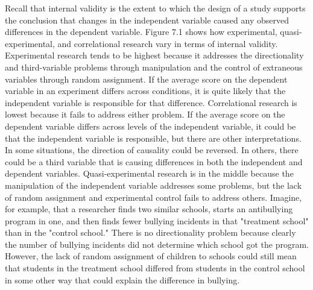 Recall that internal validity is the extent to which the design of a study supports the conclusion that changes in the independent variable caused any observed differences in the dependent variable. Figure 7.1 shows how experimental, quasi-experimental, and correlational research vary in terms of internal validity. Experimental research tends to be highest because it addresses the directionality and third-variable problems through manipulation and the control of extraneous variables through random assignment. If the average score on the dependent variable in an experiment differs across conditions, it is quite likely that the independent variable is responsible for that difference. Correlational research is lowest because it fails to address either problem. If the average score on the dependent variable differs across levels of the independent variable, it could be that the independent variable is responsible, but there are other interpretations. In some situations, the direction of causality could be reversed. In others, there could be a third variable that is causing differences in both the independent and dependent variables. Quasi-experimental research is in the middle because the manipulation of the independent variable addresses some problems, but the lack of random assignment and experimental control fails to address others. Imagine, for example, that a researcher finds two similar schools, starts an antibullying program in one, and then finds fewer bullying incidents in that "treatment school" than in the "control school." There is no directionality problem because clearly the number of bullying incidents did not determine which school got the program. However, the lack of random assignment of children to schools could still mean that students in the treatment school differed from students in the control school in some other way that could explain the difference in bullying.

